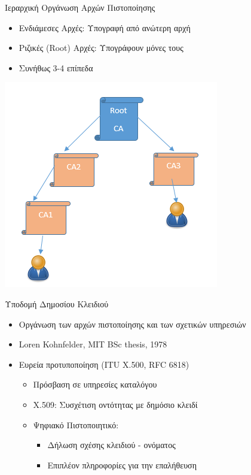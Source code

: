 \documentclass{beamer}
\begin{document}
\begin{frame}{Ιεραρχική Οργάνωση Αρχών Πιστοποίησης}
\begin{itemize} 
    \item Ενδιάμεσες Αρχές: Υπογραφή από ανώτερη αρχή 
    \item Ριζικές (Root) Αρχές: Υπογράφουν μόνες τους
    \item Συνήθως 3-4 επίπεδα
\end{itemize}
\begin{center}
\includegraphics[scale=0.5]{pki.PNG}
\end{center}
\end{frame}

\begin{frame}{Υποδομή Δημοσίου Κλειδιού}
\begin{itemize}
    \item Οργάνωση των αρχών πιστοποίησης και των σχετικών υπηρεσιών \pause
    \item Loren Kohnfelder, MIT BSc thesis, 1978 \pause
    \item Ευρεία προτυποποίηση (ITU X.500, RFC 6818)
    \begin{itemize}
        \item Πρόσβαση σε υπηρεσίες καταλόγου
        \item X.509: Συσχέτιση οντότητας με δημόσιο κλειδί
        \item Ψηφιακό Πιστοποιητικό: 
        \begin{itemize}
            \item Δήλωση σχέσης κλειδιού - ονόματος
            \item Επιπλέον πληροφορίες για την επαλήθευση
        \end{itemize}
    \end{itemize}    
\end{itemize}
\end{frame}
\end{document}
